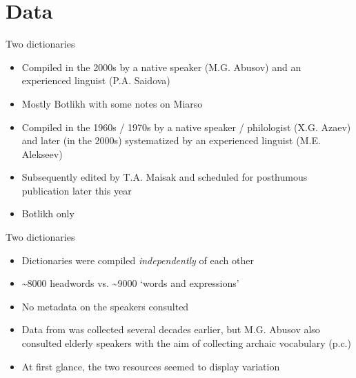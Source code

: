 \section{Data}
\begin{frame}{Two dictionaries}

\begin{block}{\citep{saidovaabusov2012}}
    \begin{itemize}
        \item Compiled in the 2000s by a native speaker (M.G. Abusov) and an experienced linguist (P.A. Saidova)
        \item Mostly Botlikh with some notes on Miarso
    \end{itemize}
\end{block}

\pause

\begin{block}{\citep{alekseev2019}}
    \begin{itemize}
        \item Compiled in the 1960s / 1970s by a native speaker / philologist (X.G. Azaev) and later (in the 2000s) systematized by an experienced linguist (M.E. Alekseev)
        \item Subsequently edited by T.A. Maisak and scheduled for posthumous publication later this year
        \item Botlikh only %
    \end{itemize}
\end{block}
\end{frame}

\begin{frame}{Two dictionaries}

\begin{itemize}
    \item Dictionaries were compiled \textit{independently} of each other
    \item \textasciitilde{}8000 headwords \citep{saidovaabusov2012} vs. \textasciitilde{}9000 `words and expressions' \citep{alekseev2019} %
    \item No metadata on the speakers consulted
    \item Data from \citep{alekseev2019} was collected several decades earlier, but M.G. Abusov also consulted elderly speakers with the aim of collecting archaic vocabulary (p.c.)
    \pause
    \item At first glance, the two resources seemed to display variation
\end{itemize}

\end{frame}

